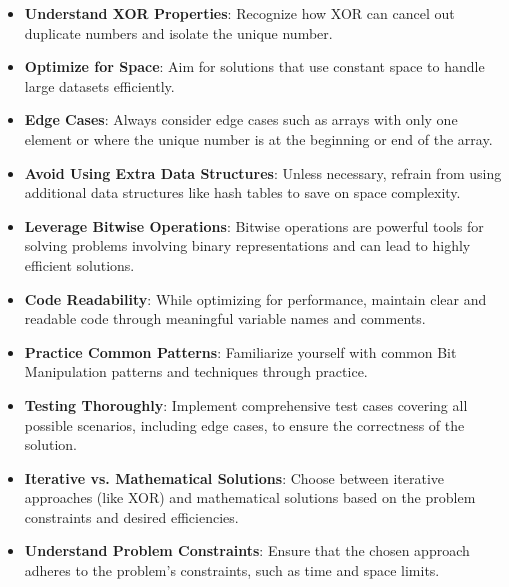 \begin{itemize}
    \item \textbf{Understand XOR Properties}: Recognize how XOR can cancel out duplicate numbers and isolate the unique number.
    
    \item \textbf{Optimize for Space}: Aim for solutions that use constant space to handle large datasets efficiently.
    
    \item \textbf{Edge Cases}: Always consider edge cases such as arrays with only one element or where the unique number is at the beginning or end of the array.
    
    \item \textbf{Avoid Using Extra Data Structures}: Unless necessary, refrain from using additional data structures like hash tables to save on space complexity.
    
    \item \textbf{Leverage Bitwise Operations}: Bitwise operations are powerful tools for solving problems involving binary representations and can lead to highly efficient solutions.
    
    \item \textbf{Code Readability}: While optimizing for performance, maintain clear and readable code through meaningful variable names and comments.
    
    \item \textbf{Practice Common Patterns}: Familiarize yourself with common Bit Manipulation patterns and techniques through practice.
    
    \item \textbf{Testing Thoroughly}: Implement comprehensive test cases covering all possible scenarios, including edge cases, to ensure the correctness of the solution.
    
    \item \textbf{Iterative vs. Mathematical Solutions}: Choose between iterative approaches (like XOR) and mathematical solutions based on the problem constraints and desired efficiencies.
    
    \item \textbf{Understand Problem Constraints}: Ensure that the chosen approach adheres to the problem's constraints, such as time and space limits.
\end{itemize}

